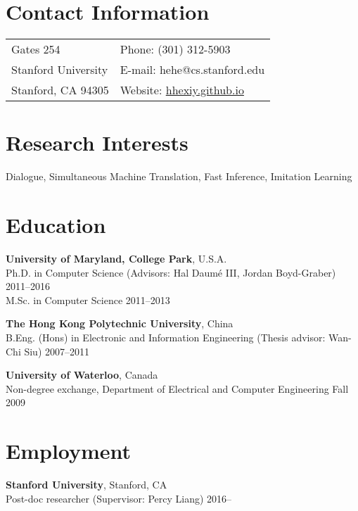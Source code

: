 \documentclass[margin,line]{resume}
\begin{document}

\begin{resume}
\section{\sc Contact Information}
\vspace{.05in}
\begin{tabular}{@{}p{2.5in}p{4in}}
Gates 254             & Phone: (301) 312-5903 \\            
Stanford University   & E-mail: hehe@cs.stanford.edu \\         
Stanford, CA 94305    & Website: \url{hhexiy.github.io}\\        
\end{tabular}

\section{\sc Research Interests}
Dialogue, Simultaneous Machine Translation, Fast Inference, Imitation Learning

\section{\sc Education}
{\bf University of Maryland, College Park}, U.S.A.\\
Ph.D. in Computer Science (Advisors: Hal Daum\'e III, Jordan Boyd-Graber) \hfill 2011--2016\\
M.Sc. in Computer Science \hfill 2011--2013

{\bf The Hong Kong Polytechnic University}, China\\ 
B.Eng. (Hons) in Electronic and Information Engineering (Thesis advisor: Wan-Chi Siu) \hfill 2007--2011

{\bf University of Waterloo}, Canada\\
Non-degree exchange, Department of Electrical and Computer Engineering \hfill Fall 2009

\section{\sc Employment}
{\bf Stanford University}, Stanford, CA\\
Post-doc researcher (Supervisor: Percy Liang) \hfill 2016--


\end{resume}
\end{document}
